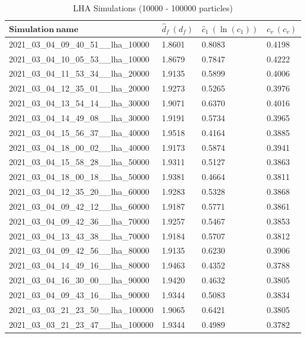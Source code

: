 \documentclass[12pt,a4paper]{scrartcl}
\newcommand{\1}{\mathbbm{1}}
\theoremstyle{definition}
\numberwithin{equation}{section}
\begin{document}
\begin{table}[t]
	\centering
	\begin{tabular}{llll}
		$\mathbf{Simulation\ name}$                       & $\hat d_f\ (d_f)$   & $\hat c_1\ (\ln(c_1))$   & $\hat c_v\ (c_v)$\\
		\hline
		2021\_03\_04\_09\_40\_51\_\_lha\_10000  & 1.8601 & 0.8083 & 0.4198\\
		2021\_03\_04\_10\_05\_53\_\_lha\_10000  & 1.8679 & 0.7847 & 0.4222\\
		2021\_03\_04\_11\_53\_34\_\_lha\_20000  & 1.9135 & 0.5899 & 0.4006\\
		2021\_03\_04\_12\_35\_01\_\_lha\_20000  & 1.9273 & 0.5265 & 0.3976\\
		2021\_03\_04\_13\_54\_14\_\_lha\_30000  & 1.9071 & 0.6370 & 0.4016\\
		2021\_03\_04\_14\_49\_08\_\_lha\_30000  & 1.9191 & 0.5734 & 0.3965\\
		2021\_03\_04\_15\_56\_37\_\_lha\_40000  & 1.9518 & 0.4164 & 0.3885\\
		2021\_03\_04\_18\_00\_02\_\_lha\_40000  & 1.9173 & 0.5874 & 0.3941\\
		2021\_03\_04\_15\_58\_28\_\_lha\_50000  & 1.9311 & 0.5127 & 0.3863\\
		2021\_03\_04\_18\_00\_18\_\_lha\_50000  & 1.9381 & 0.4664 & 0.3811\\
		2021\_03\_04\_12\_35\_20\_\_lha\_60000  & 1.9283 & 0.5328 & 0.3868\\
		2021\_03\_04\_09\_42\_12\_\_lha\_60000  & 1.9187 & 0.5771 & 0.3861\\
		2021\_03\_04\_09\_42\_36\_\_lha\_70000  & 1.9257 & 0.5467 & 0.3853\\
		2021\_03\_04\_13\_43\_38\_\_lha\_70000  & 1.9184 & 0.5707 & 0.3812\\
		2021\_03\_04\_09\_42\_56\_\_lha\_80000  & 1.9135 & 0.6230 & 0.3906\\
		2021\_03\_04\_14\_49\_16\_\_lha\_80000  & 1.9463 & 0.4352 & 0.3788\\
		2021\_03\_04\_16\_30\_00\_\_lha\_90000  & 1.9420 & 0.4632 & 0.3805\\
		2021\_03\_04\_09\_43\_16\_\_lha\_90000  & 1.9344 & 0.5083 & 0.3834\\
		2021\_03\_03\_21\_23\_50\_\_lha\_100000 & 1.9065 & 0.6421 & 0.3805\\
		2021\_03\_03\_21\_23\_47\_\_lha\_100000 & 1.9344 & 0.4989 & 0.3782
	\end{tabular}
	\caption{LHA Simulations (10000 - 100000 particles)}
	\label{lhasimulation}
\end{table}
\end{document}
